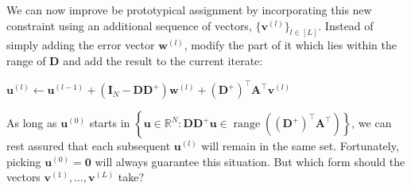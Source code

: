 We can now improve be prototypical assignment by incorporating this new constraint using an additional sequence of vectors, $\{\mathbf{v}^{(l)}\}_{l \in [L]}$. Instead of simply adding the error vector $\mathbf{w}^{(l)}$, modify the part of it which lies within the range of $\mathbf{D}$ and add the result to the current iterate:
\begin{algorithm}[H]
    \begin{algorithmic}[1]
        \State{$\ldots$}
        \State $\mathbf{u}^{(l)} \gets \mathbf{u}^{(l-1)} + \left ( \mathbf{I}_N - \mathbf{D} \mathbf{D}^{+}\right ) \mathbf{w}^{(l)} + (\mathbf{D}^{+})^{\top}\mathbf{A}^{\top} \mathbf{v}^{(l)}$
        \State{$\ldots$}
    \end{algorithmic}
\end{algorithm}

As long as $\mathbf{u}^{(0)}$ starts in $\left\{\mathbf{u} \in \mathbb{R}^{N} : \mathbf{D} \mathbf{D}^{+}\mathbf{u} \in \operatorname{range} \left ( (\mathbf{D}^{+})^{\top}\mathbf{A^{\top}} \right ) \right\}$, we can rest assured that each subsequent $\mathbf{u}^{(l)}$ will remain in the same set. Fortunately, picking $\mathbf{u}^{(0)} = \mathbf{0}$ will always guarantee this situation. But which form should the vectors $\mathbf{v}^{(1)}, \dots, \mathbf{v}^{(L)}$ take?

